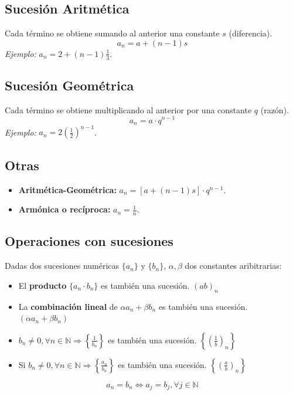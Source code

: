 \documentclass[a4paper,12pt]{article}
\begin{document}
\subsection{Sucesión Aritmética}
Cada término se obtiene sumando al anterior una constante $s$ (diferencia).
$$ a_n = a + (n-1)s $$
\textit{Ejemplo:} $a_n = 2 + (n-1)\frac{1}{3}$.

\subsection{Sucesión Geométrica}
Cada término se obtiene multiplicando al anterior por una constante $q$ (razón).
$$ a_n = a \cdot q^{n-1} $$
\textit{Ejemplo:} $a_n = 2\left(\frac{1}{2}\right)^{n-1}$.

\subsection{Otras}
\begin{itemize}
    \item \textbf{Aritmética-Geométrica:} $a_n = [a + (n-1)s] \cdot q^{n-1}$.
    \item \textbf{Armónica o recíproca:} $a_n = \frac{1}{n}$.
\end{itemize}

\subsection{Operaciones con sucesiones}
Dadas dos sucesiones numéricas $\{a_n\}$ y $\{b_n\}$, $\alpha, \beta$ dos constantes aribitrarias:
\begin{itemize}
    \item El \textbf{producto} $\{a_n \cdot b_n\}$ es también una sucesión. ${(ab)_n}$
    \item La \textbf{combinación lineal} de ${\alpha a_n + \beta b_n}$ es también una sucesión. ${(\alpha a_n + \beta b_n)}$
    \item ${b_n} \neq 0, \forall n \in \mathbb{N} \Rightarrow \left\{\frac{1}{b_n}\right\}$ es también una sucesión. $\left\{(\frac{1}{b})_n\right\}$
    \item Si ${b_n} \neq 0, \forall n \in \mathbb{N} \Rightarrow \left\{\frac{a_n}{b_n}\right\}$ es también una sucesión. $\left\{(\frac{a}{b})_n\right\}$
\end{itemize}

\begin{tcolorbox}[title=Igualdad de Sucesiones,colback=blue!5!white,colframe=blue!75!black]
    $${a_n} = {b_n} \Leftrightarrow a_j = b_j, \forall j \in \mathbb{N}$$
\end{tcolorbox}
\end{document}
